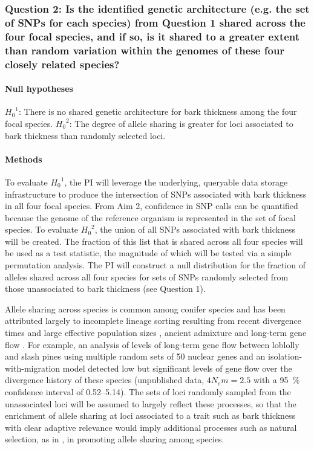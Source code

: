 \subsubsection*{Question 2: Is the identified genetic architecture (e.g. the set of SNPs for each species) from Question 1 
shared across the four focal species, and if so, is it shared to a greater extent than random variation within the 
genomes of these four closely related species?}

\paragraph{Null hypotheses}  ${H_{0}}^1$: There is no shared genetic architecture for bark thickness among 
the four focal species. ${H_{0}}^2$: The degree of allele sharing is greater for loci associated to 
bark thickness than randomly selected loci.

\paragraph{Methods} To evaluate ${H_{0}}^1$, the PI will leverage the underlying, queryable data storage infrastructure 
to produce the intersection of SNPs associated with bark thickness in all four focal species.  From Aim 2, confidence in SNP 
calls can be quantified because the genome of the reference organism is represented in the set of focal species.  
To evaluate ${H_{0}}^2$, the union of all SNPs associated with bark thickness 
will be created. The fraction of this list that is shared across all four species will be used as a test statistic, the magnitude 
of which will be tested via a simple permutation analysis. The PI will construct a null distribution for the fraction of alleles 
shared across all four species for sets of SNPs randomly selected from those unassociated to bark thickness (see Question 1). 

Allele sharing across species is common among conifer species and has been attributed largely to incomplete lineage 
sorting resulting from recent divergence times and large effective population sizes \citep{Syring:2007gd,Willyard:2009ez}, 
ancient admixture \citep{Liston:2007cx} and 
long-term gene flow \citep{Zhou:2010hk}. For example, an analysis of 
levels of long-term gene flow between loblolly and slash pines using multiple random sets of 50 nuclear genes and an 
isolation-with-migration model \citep{Becquet:2007js} detected low but significant levels of gene flow over the divergence history 
of these species (unpublished data, $4 N_{e}m = 2.5$ with a \SI{95}{\percent} confidence interval of 0.52--5.14). The sets of loci 
randomly sampled from the unassociated loci will be assumed to largely reflect these processes, so that the 
enrichment of allele sharing at loci associated to a trait such as bark thickness with clear adaptive relevance 
\citep{He:2012bz} would imply additional processes such as natural selection, as in \cite{Segurel:vf}, in promoting allele 
sharing among species.

